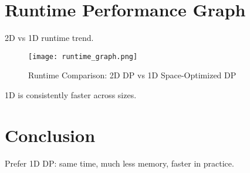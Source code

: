 \documentclass[12pt]{article}
\begin{document}
\section{Runtime Performance Graph}
2D vs 1D runtime trend.

\begin{figure}[h!]
\centering
\texttt{[image: runtime\_graph.png]}
\caption{Runtime Comparison: 2D DP vs 1D Space-Optimized DP}
\label{fig:runtime_graph}
\end{figure}

1D is consistently faster across sizes.

\section{Conclusion}
Prefer 1D DP: same time, much less memory, faster in practice.
\end{document}
